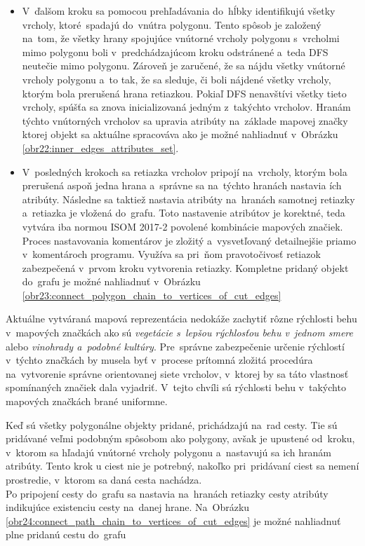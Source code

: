 \begin{itemize}
    \item V~ďalšom kroku sa pomocou prehľadávania do~hĺbky identifikujú všetky vrcholy, ktoré~spadajú do~vnútra polygonu. Tento spôsob je založený na~tom, že všetky hrany spojujúce vnútorné vrcholy polygonu s~vrcholmi mimo polygonu boli v~predchádzajúcom kroku odstránené a~teda DFS neutečie mimo polygonu. Zároveň je zaručené, že sa nájdu všetky vnútorné vrcholy polygonu a~to tak, že sa sleduje, či boli nájdené všetky vrcholy, ktorým bola prerušená hrana retiazkou. Pokiaľ DFS nenavštívi všetky tieto vrcholy, spúšťa sa znova inicializovaná jedným z~takýchto vrcholov. Hranám týchto vnútorných vrcholov sa upravia atribúty na~základe mapovej značky ktorej objekt sa aktuálne spracováva ako je možné nahliadnuť v~Obrázku \ref{obr22:inner_edges_attributes_set}.
    \item V~posledných krokoch sa retiazka vrcholov pripojí na~vrcholy, ktorým bola prerušená aspoň jedna hrana a~správne sa na~týchto hranách nastavia ích atribúty. Následne sa taktiež nastavia atribúty na~hranách samotnej retiazky a~retiazka je vložená do~grafu. Toto nastavenie atribútov je korektné, teda vytvára iba normou ISOM 2017-2 povolené kombinácie mapových značiek. Proces nastavovania komentárov je zložitý a~vysvetľovaný detailnejšie priamo v~komentároch programu. Využíva sa pri~ňom pravotočivosť retiazok zabezpečená v~prvom kroku vytvorenia retiazky. Kompletne pridaný objekt do~grafu je možné nahliadnuť v~Obrázku \ref{obr23:connect_polygon_chain_to_vertices_of_cut_edges}
\end{itemize}

Aktuálne vytváraná mapová reprezentácia nedokáže zachytiť rôzne rýchlosti behu v~mapových značkách ako sú \textit{vegetácie s~lepšou rýchlosťou behu v~jednom smere} alebo \textit{vinohrady a~podobné kultúry}. Pre~správne zabezpečenie určenie rýchlostí v~týchto značkách by musela byť v~procese prítomná zložitá procedúra na~vytvorenie správne orientovanej siete vrcholov, v~ktorej by sa táto vlastnosť spomínaných značiek dala vyjadriť. V~tejto chvíli sú rýchlosti behu v~takýchto mapových značkách brané uniformne. 

Keď sú všetky polygonálne objekty pridané, prichádzajú na~rad cesty. Tie sú pridávané veľmi podobným spôsobom ako polygony, avšak je upustené od~kroku, v~ktorom sa hľadajú vnútorné vrcholy polygonu a~nastavujú sa ich hranám atribúty. Tento krok u ciest nie je potrebný, nakoľko pri~pridávaní ciest sa nemení prostredie, v~ktorom sa daná cesta nachádza.\\ 
Po pripojení cesty do~grafu sa nastavia na~hranách retiazky cesty atribúty indikujúce existenciu cesty na~danej hrane. Na~Obrázku \ref{obr24:connect_path_chain_to_vertices_of_cut_edges} je možné nahliadnuť plne pridanú cestu do~grafu

